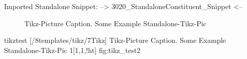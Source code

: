 \np
Imported Standalone Snippet: -->
{3020_StandaloneConstituent_Snippet}
<--


\npi%
{%
    \Huge%
    \sffamily%
    \textcolor{violet}{%
    }\nl%
    \textcolor{violet}{%
    }%
}%


\np
%
\begin{figure}[!htpb]
    \centering
    \caption{Tikz-Picture Caption. Some Example Standalone-Tikz-Pic}
    \label{fig:tikz_test}
\end{figure}
%
%
\tikzabb%
{tikztest}%
[\DenKrLayoutMainRootDir/8templates/tikz/7Tikz]%
{%
Tikz-Picture Caption. Some Example Standalone-Tikz-Pic
}%
{1}[1,1,!ht]%
{fig:tikz_test2}%
%





